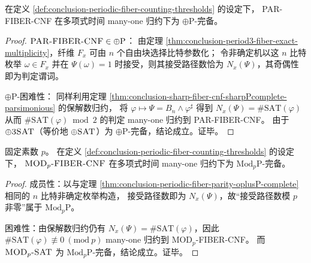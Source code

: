 \begin{theorem}\label{thm:conclusion-periodic-fiber-parity-oplusP-complete}
在定义 \ref{def:conclusion-periodic-fiber-counting-thresholds} 的设定下，
{\normalfont\textsc{PAR-FIBER-CNF}} 在多项式时间 many-one 归约下为 \(\oplus\mathrm{P}\)-完备。
\end{theorem}
\begin{proof}
\(\textsc{PAR-FIBER-CNF}\in\oplus\mathrm{P}\)：
由定理 \ref{thm:conclusion-period3-fiber-exact-multiplicity}，纤维 \(F_x\) 可由 \(n\) 个自由块选择比特参数化；
令非确定机以这 \(n\) 比特枚举 \(\omega\in F_x\) 并在 \(\Psi(\omega)=1\) 时接受，则其接受路径数恰为 \(N_x(\Psi)\)，其奇偶性即为判定谓词。
\par
\(\oplus\mathrm{P}\)-困难性：
同样利用定理 \ref{thm:conclusion-sharp-fiber-cnf-sharpPcomplete-parsimonious} 的保解数归约，
将 \(\varphi\mapsto \Psi=B_n\wedge\varphi^\sharp\) 得到
\(
N_x(\Psi)=\#\mathrm{SAT}(\varphi)
\)
从而 \(\#\mathrm{SAT}(\varphi)\bmod 2\) 的判定 many-one 归约到 \textsc{PAR-FIBER-CNF}。
由于 \(\oplus\textsc{3SAT}\)（等价地 \(\oplus\textsc{SAT}\)）为 \(\oplus\mathrm{P}\)-完备，结论成立。证毕。
\end{proof}

\begin{theorem}\label{thm:conclusion-periodic-fiber-modp-modpP-complete}
固定素数 \(p\)。
在定义 \ref{def:conclusion-periodic-fiber-counting-thresholds} 的设定下，
\(\text{\normalfont\textsc{MOD}}_p\text{\normalfont\textsc{-FIBER-CNF}}\) 在多项式时间 many-one 归约下为 \(\mathrm{Mod}_p\mathrm{P}\)-完备。
\end{theorem}
\begin{proof}
成员性：以与定理 \ref{thm:conclusion-periodic-fiber-parity-oplusP-complete} 相同的 \(n\) 比特非确定枚举构造，
接受路径数即为 \(N_x(\Psi)\)，故“接受路径数模 \(p\) 非零”属于 \(\mathrm{Mod}_p\mathrm{P}\)。
\par
困难性：由保解数归约仍有 \(N_x(\Psi)=\#\mathrm{SAT}(\varphi)\)，因此 \(\#\mathrm{SAT}(\varphi)\not\equiv 0\ (\mathrm{mod}\ p)\) many-one 归约到 \textsc{MOD}\(_p\)\textsc{-FIBER-CNF}。
而 \(\textsc{MOD}_p\textsc{-SAT}\) 为 \(\mathrm{Mod}_p\mathrm{P}\)-完备，结论成立。证毕。
\end{proof}

